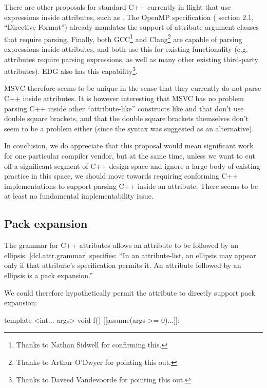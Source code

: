There are other proposals for standard C++ currently in flight that use expressions inside attributes, such as  \cite{P1144R5}. The OpenMP specification (\cite{OpenMP5.1} section 2.1, ``Directive Format'') already mandates the support of attribute argument clauses that require parsing. Finally, both GCC\footnote{Thanks to Nathan Sidwell for confirming this.} and Clang\footnote{Thanks to Arthur O'Dwyer for pointing this out.} are capable of parsing expressions inside attributes, and both use this for existing functionality (e.g.  attributes require parsing expressions, as well as many other existing third-party attributes). EDG also has this capability\footnote{Thanks to Daveed Vandevoorde for pointing this out.}.

MSVC therefore seems to be unique in the sense that they currently do not parse C++ inside attributes. It is however interesting that MSVC has no problem parsing C++ inside other ``attribute-like'' constructs like  and  that don't use double square brackets, and that the double square brackets themselves don't seem to be a problem either (since the  syntax was suggested as an alternative).

In conclusion, we do appreciate that this proposal would mean significant work for one particular compiler vendor, but at the same time, unless we want to cut off a significant segment of C++ design space and ignore a large body of existing practice in this space, we should move towards requiring conforming C++ implementations to support parsing C++ inside an attribute. There seems to be at least no fundamental implementability issue.

\subsection{Pack expansion}

The grammar for C++ attributes allows an attribute to be followed by an ellipsis. [dcl.attr.grammar] specifies: ``In an attribute-list, an ellipsis may appear only if that attribute's specification permits it. An attribute followed by an ellipsis is a pack expansion.''

 We could therefore hypothetically permit the  attribute to directly support pack expansion:

\begin{codeblock}
template <int... args>
void f() {
    [[assume(args >= 0)...]];
}
\end{codeblock}

